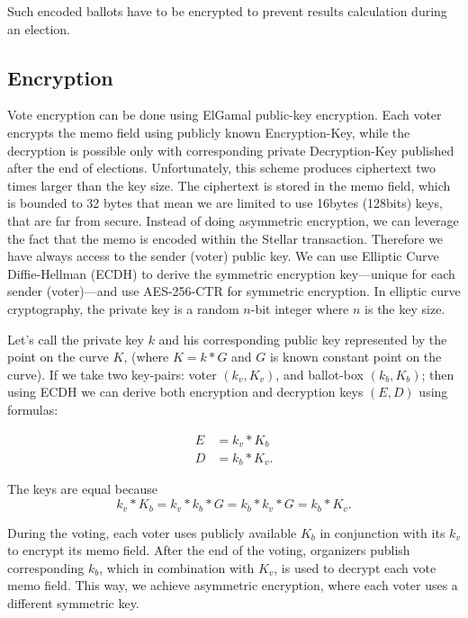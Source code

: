 \documentclass[applsci,article,submit,moreauthors,pdftex]{Definitions/mdpi}
\begin{document}
Such encoded ballots have to be encrypted to prevent results calculation during an election.

\subsection{Encryption}
\label{encryption}
Vote encryption can be done using ElGamal public-key encryption. Each voter encrypts the memo field using publicly known Encryption-Key, while the decryption is possible only with corresponding private Decryption-Key published after the end of elections. Unfortunately, this scheme produces ciphertext two times larger than the key size. The ciphertext is stored in the memo field, which is bounded to 32 bytes that mean we are limited to use 16bytes (128bits) keys, that are far from secure. Instead of doing asymmetric encryption, we can leverage the fact that the memo is encoded within the Stellar transaction. Therefore we have always access to the sender (voter) public key. We can use Elliptic Curve Diffie-Hellman (ECDH) to derive the symmetric encryption key––unique for each sender (voter)––and use AES-256-CTR for symmetric encryption. In elliptic curve cryptography, the private key is a random $n$-bit integer where $n$ is the key size. 

\begin{samepage} 
Let's call the private key $k$ and his corresponding public key represented by the point on the curve $K$, (where $K = k * G$ and $G$ is known constant point on the curve). If we take two key-pairs: voter $(k_v,K_v)$, and ballot-box $(k_b,K_b)$; then using ECDH we can derive both encryption and decryption keys $(E,D)$ using formulas:

\begin{align}
E &= k_v * K_b \\
D &= k_b * K_v.    
\end{align}

The keys are equal because 
\begin{equation}
k_v * K_b = k_v * k_b * G = k_b * k_v * G = k_b * K_v.
\end{equation}
\end{samepage} 

During the voting, each voter uses publicly available $K_b$ in conjunction with its $k_v$ to encrypt its memo field. After the end of the voting, organizers publish corresponding $k_b$, which in combination with $K_v$, is used to decrypt each vote memo field. This way, we achieve asymmetric encryption, where each voter uses a different symmetric key.
\end{document}
